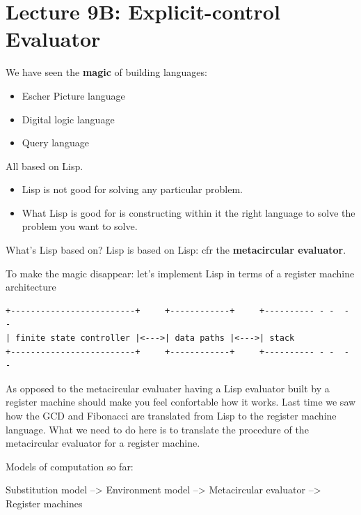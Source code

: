 \documentclass[a4paper,twoside]{article}
\numberwithin{equation}{section}
\begin{document}
\section{Lecture 9B: Explicit-control Evaluator}
We have seen the \textbf{magic} of building languages:

\begin{itemize}
    \item Escher Picture language
    \item Digital logic language
    \item Query language
\end{itemize}
All based on Lisp.
\begin{itemize}
    \item  Lisp is not good for solving any particular problem.
    \item  What Lisp is good for is constructing within it the right language to solve the problem you want to solve.
\end{itemize}
What's Lisp based on? Lisp is based on Lisp: cfr the \textbf{metacircular evaluator}.

\begin{center}
    To make the magic disappear: let's implement Lisp in terms of a register machine architecture
\end{center}
\begin{lstlisting}
+-------------------------+     +------------+     +---------- - -  -   -
| finite state controller |<--->| data paths |<--->| stack
+-------------------------+     +------------+     +---------- - -  -   -
\end{lstlisting}

As opposed to the metacircular evaluater having a Lisp evaluator built by a register machine should
make you feel confortable how it works. Last time we saw how the GCD and Fibonacci are translated from Lisp
to the register machine language. What we need to do here is to translate the procedure of the metacircular
evaluator for a register machine.

Models of computation so far:
\begin{center}
    Substitution model --> Environment model --> Metacircular evaluator --> Register machines
\end{center}
\end{document}
